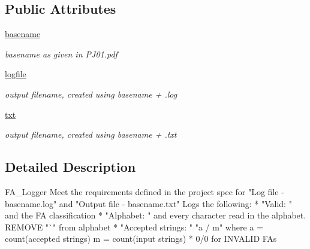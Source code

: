 \subsection*{Public Attributes}
\begin{DoxyCompactItemize}
\item 
\mbox{\label{classfa__logger_1_1_f_a___logger_a69209e30b1130bed6d89e9718b948cef}} 
\mbox{\hyperlink{classfa__logger_1_1_f_a___logger_a69209e30b1130bed6d89e9718b948cef}{basename}}
\begin{DoxyCompactList}\small\item\em basename as given in P\+J01.\+pdf \end{DoxyCompactList}\item 
\mbox{\label{classfa__logger_1_1_f_a___logger_ad5dc54ad31adc60ebf4dd2ba4348a8a2}} 
\mbox{\hyperlink{classfa__logger_1_1_f_a___logger_ad5dc54ad31adc60ebf4dd2ba4348a8a2}{logfile}}
\begin{DoxyCompactList}\small\item\em output filename, created using basename + .log \end{DoxyCompactList}\item 
\mbox{\label{classfa__logger_1_1_f_a___logger_ad53b06d328772d47b6669970488232c1}} 
\mbox{\hyperlink{classfa__logger_1_1_f_a___logger_ad53b06d328772d47b6669970488232c1}{txt}}
\begin{DoxyCompactList}\small\item\em output filename, created using basename + .txt \end{DoxyCompactList}\end{DoxyCompactItemize}


\subsection{Detailed Description}
\begin{DoxyVerb}FA_Logger
    Meet the requirements defined in the project spec for "Log file - basename.log" and "Output file - basename.txt"
    Logs the following:
        * "Valid: " and the FA classification
        * "Alphabet: " and every character read in the alphabet.  REMOVE "`" from alphabet
        * "Accepted strings: " "a / m" where a = count(accepted strings) m = count(input strings)
        * 0/0 for INVALID FAs
\end{DoxyVerb}
 

